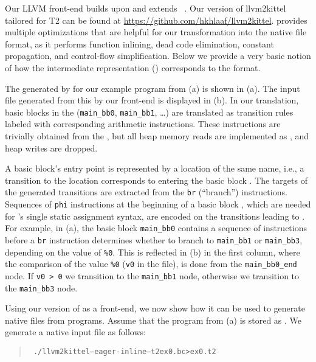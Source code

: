  Our LLVM front-end builds upon and extends
~\cite{Falke11}. Our version of
  \textsf{llvm2kittel} tailored for \textsf{T2} can be found at
  \url{https://github.com/hkhlaaf/llvm2kittel}.
 provides multiple optimizations that are helpful for our
transformation into the native \ttwo file format, as it performs function
inlining, dead code elimination, constant propagation, and control-flow
simplification. 
Below we provide a very basic notion of how the  intermediate
representation () corresponds to the  format.

The  generated by  for our example  program
from (a) is shown in (a).
The  input file generated from this by our  front-end
is displayed in (b).
In our translation, basic blocks in the  (\texttt{main\_bb0},
\texttt{main\_bb1}, \ldots) are translated as transition rules labeled with
corresponding arithmetic instructions.
These instructions are trivially obtained from the , but
all heap memory reads are implemented as , and heap writes
are dropped.

A basic block's entry point is represented by a location of the same name, i.e.,
a transition to the location  corresponds to entering the basic
block .
The targets of the generated transitions are extracted from the \texttt{br}
(``branch'') instructions.
Sequences of \texttt{phi} instructions at the beginning of a basic block ,
which are needed for 's single static assignment syntax, are
encoded on the transitions leading to .
For example, in (a), the basic block \texttt{main\_bb0} contains a
sequence of instructions before a \texttt{br} instruction determines
whether to branch to \texttt{main\_bb1} or \texttt{main\_bb3}, depending on the
value of \texttt{\%0}. 
This is reflected in (b) in the first column, where the comparison of
the value \texttt{\%0} (\texttt{v0} in the \ttwo file), is done from the 
\texttt{main\_bb0\_end} node.
If \texttt{v0 > 0} we transition to the \texttt{main\_bb1} node, otherwise we
transition  to the \texttt{main\_bb3} node.


Using our version of  as a front-end, we now show how it can be used to
generate native \ttwo files from  programs. Assume that the 
program from (a) is stored as . We generate a \ttwo 
native input file as follows:
\begin{quote}
  \vspace{-1ex}
  \begin{alltt}
    \small
\ ./llvm2kittel --eager-inline --t2 ex0.bc > ex0.t2
  \end{alltt}
  \vspace{-1ex}
\end{quote}

